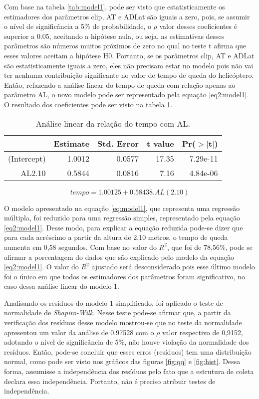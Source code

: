 Com base na tabela \ref{tab:model1}, pode ser visto que estatisticamente os estimadores dos parâmetros clip, AT e ADLat são iguais a zero, pois, se assumir o nível de significância a 5\% de probabilidade, o $\rho$ valor desses coeficientes é superior a 0.05, aceitando a hipótese nula, ou seja, as estimativas desses parâmetros são números muitos próximos de zero no qual no teste t afirma que esses valores aceitam a hipótese H0. Portanto, se os parâmetros clip, AT e ADLat são estatisticamente iguais a zero, eles não precisam estar no modelo pois não vai ter nenhuma contribuição significante no valor de tempo de queda do helicóptero. Então, refazendo a análise linear do tempo de queda com relação apenas ao parâmetro AL, o novo modelo pode ser representado pela equação \ref{eq2:model1}. O resultado dos coeficientes pode ser visto na tabela \ref{tab2:model1}.  

\begin{table}[ht]
    \centering
    \caption{Análise linear da relação do tempo com AL.}
    \begin{tabular}{rrrrr}
      \hline
     & Estimate & Std. Error & t value & Pr($>$$|$t$|$) \\ 
      \hline
    (Intercept) & 1.0012 & 0.0577 & 17.35 & 7.29e-11 \\ 
      AL2.10 & 0.5844 & 0.0816 & 7.16 & 4.84e-06 \\ 
       \hline
    \end{tabular}
    \label{tab2:model1}
\end{table}

\begin{equation}
    tempo = 1.00125 + 0.58438.AL(2.10)
    \label{eq2:model1}
\end{equation}

O modelo apresentado na equação \ref{eq:model1}, que representa uma regressão múltipla, foi reduzido para uma regressão simples, representado pela equação \ref{eq2:model1}. Desse modo, para explicar a equação reduzida pode-se dizer que para cada acréscimo a partir da altura de 2,10 metros, o tempo de queda aumenta em 0,58 segundos. Com base no valor do $R^2$, que foi de 78,56\%, pode se afirmar a porcentagem do dados que são explicado pelo modelo da equação \ref{eq2:model1}. O valor do $R^2$ ajustado será desconsiderado pois esse último modelo foi o único em que todos os estimadores dos parâmetros foram significativo, no caso dessa análise linear do modelo 1. 

Analisando os resíduos do modelo 1 simplificado, foi aplicado o teste de normalidade de \textit{Shapiro-Wilk}. Nesse teste pode-se afirmar que, a partir da verificação dos resíduos desse modelo mostrou-se que no teste da normalidade apresentou um valor da análise de 0.97528 com o $\rho$ valor respectivo de 0,9152, adotando o nível de significância de 5\%, não houve violação da normalidade dos resíduos. Então, pode-se concluir que esses erros (resíduos) tem uma distribuição normal, como pode ser visto nos gráficos das figuras \ref{fig:qq} e \ref{fig:hist}. Dessa forma, assumisse a independência dos resíduos pelo fato que a estrutura de coleta declara essa independência. Portanto, não é preciso atribuir testes de independência.

